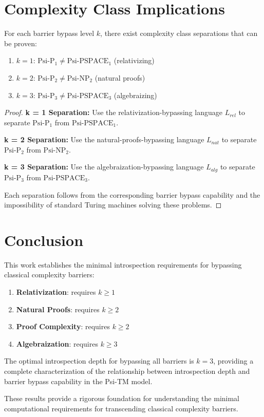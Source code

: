\section{Complexity Class Implications}

\begin{theorem}
For each barrier bypass level $k$, there exist complexity class separations that can be proven:
\begin{enumerate}
\item $k = 1$: $\text{Psi-P}_1 \neq \text{Psi-PSPACE}_1$ (relativizing)
\item $k = 2$: $\text{Psi-P}_2 \neq \text{Psi-NP}_2$ (natural proofs)
\item $k = 3$: $\text{Psi-P}_3 \neq \text{Psi-PSPACE}_3$ (algebraizing)
\end{enumerate}
\end{theorem}

\begin{proof}
\textbf{k = 1 Separation:}
Use the relativization-bypassing language $L_{rel}$ to separate $\text{Psi-P}_1$ from $\text{Psi-PSPACE}_1$.

\textbf{k = 2 Separation:}
Use the natural-proofs-bypassing language $L_{nat}$ to separate $\text{Psi-P}_2$ from $\text{Psi-NP}_2$.

\textbf{k = 3 Separation:}
Use the algebraization-bypassing language $L_{alg}$ to separate $\text{Psi-P}_3$ from $\text{Psi-PSPACE}_3$.

Each separation follows from the corresponding barrier bypass capability and the impossibility of standard Turing machines solving these problems.
\end{proof}

\section{Conclusion}

This work establishes the minimal introspection requirements for bypassing classical complexity barriers:

\begin{enumerate}
\item \textbf{Relativization}: requires $k \geq 1$
\item \textbf{Natural Proofs}: requires $k \geq 2$
\item \textbf{Proof Complexity}: requires $k \geq 2$
\item \textbf{Algebraization}: requires $k \geq 3$
\end{enumerate}

The optimal introspection depth for bypassing all barriers is $k = 3$, providing a complete characterization of the relationship between introspection depth and barrier bypass capability in the Psi-TM model.

These results provide a rigorous foundation for understanding the minimal computational requirements for transcending classical complexity barriers.

